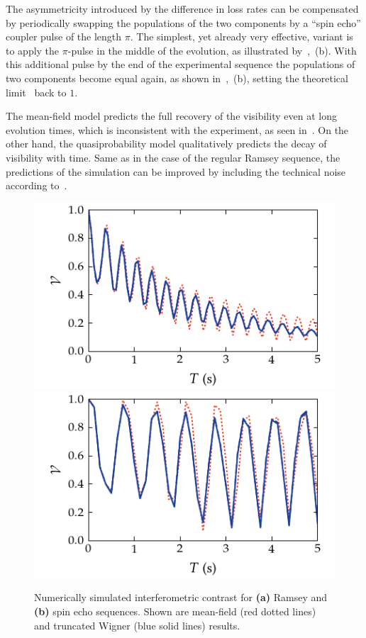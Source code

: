 The asymmetricity introduced by the difference in loss rates can be compensated by periodically swapping the populations of the two components by a ``spin echo'' coupler pulse of the length $\pi$.
The simplest, yet already very effective, variant is to apply the $\pi$-pulse in the middle of the evolution, as illustrated by~,~(b).
With this additional pulse by the end of the experimental sequence the populations of two components become equal again, as shown in~,~(b), setting the theoretical limit~ back to $1$.

The mean-field model predicts the full recovery of the visibility even at long evolution times, which is inconsistent with the experiment, as seen in~.
On the other hand, the quasiprobability model qualitatively predicts the decay of visibility with time.
Same as in the case of the regular Ramsey sequence, the predictions of the simulation can be improved by including the technical noise according to~.

\begin{figure}
    \centerline{%
    \includegraphics{figures_generated/bec_noise/ramsey_visibility_long.pdf}%
    \includegraphics{figures_generated/bec_noise/echo_visibility_long.pdf}}

    \caption{Numerically simulated interferometric contrast for \textbf{(a)} Ramsey and \textbf{(b)} spin echo sequences.
    Shown are mean-field (red dotted lines) and truncated Wigner (blue solid lines) results.}

    \label{fig:bec-noise:visibility:visibility-long}
\end{figure}

